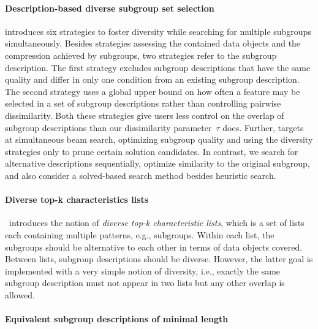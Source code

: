 \documentclass{article}
\theoremstyle{definition}
\begin{document}
\paragraph{Description-based diverse subgroup set selection}

\cite{leeuwen2012diverse} introduces six strategies to foster diversity while searching for multiple subgroups simultaneously.
Besides strategies assessing the contained data objects and the compression achieved by subgroups, two strategies refer to the subgroup description.
The first strategy excludes subgroup descriptions that have the same quality and differ in only one condition from an existing subgroup description.
The second strategy uses a global upper bound on how often a feature may be selected in a set of subgroup descriptions rather than controlling pairwise dissimilarity.
Both these strategies give users less control on the overlap of subgroup descriptions than our dissimilarity parameter~$\tau$ does.
Further, \cite{leeuwen2012diverse} targets at simultaneous beam search, optimizing subgroup quality and using the diversity strategies only to prune certain solution candidates.
In contrast, we search for alternative descriptions sequentially, optimize similarity to the original subgroup, and also consider a solved-based search method besides heuristic search.

\paragraph{Diverse top-k characteristics lists}

\cite{lopez2023discovering}~introduces the notion of \emph{diverse top-k characteristic lists}, which is a set of lists each containing multiple patterns, e.g., subgroups.
Within each list, the subgroups should be alternative to each other in terms of data objects covered.
Between lists, subgroup descriptions should be diverse.
However, the latter goal is implemented with a very simple notion of diversity, i.e., exactly the same subgroup description must not appear in two lists but any other overlap is allowed.

\paragraph{Equivalent subgroup descriptions of minimal length}
\end{document}
